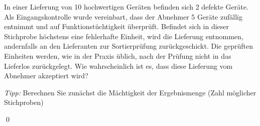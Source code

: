 \documentclass{abgabe}
\begin{document}
\begin{questions}
    \question
    In einer Lieferung von 10 hochwertigen Geräten befinden sich 2 defekte Geräte. 
    Als Eingangskontrolle wurde vereinbart, dass der Abnehmer 5 Geräte zufällig entnimmt und auf Funktionstüchtigkeit überprüft. 
    Befindet sich in dieser Stichprobe höchstens eine fehlerhafte Einheit, wird die Lieferung entnommen, andernfalls an den Lieferanten zur Sortierprüfung zurückgeschickt. 
    Die geprüften Einheiten werden, wie in der Praxis üblich, nach der Prüfung nicht in das Lieferlos zurückgelegt. 
    Wie wahrscheinlich ist es, dass diese Lieferung vom Abnehmer akzeptiert wird? 
    
    \emph{Tipp:} Berechnen Sie zunächst die Mächtigkeit der Ergebnismenge (Zahl möglicher Stichproben)
    \begin{solution}

        \qed
    \end{solution}
\end{questions}
\end{document}
